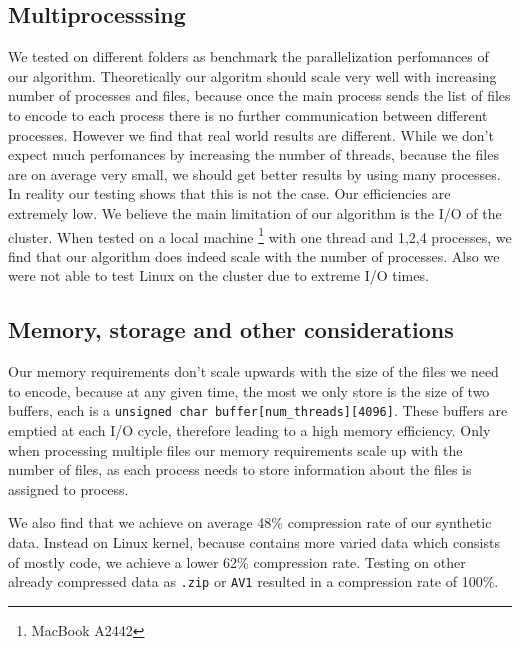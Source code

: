 \subsection{Multiprocesssing}
We tested on different folders as benchmark the parallelization perfomances of our algorithm. Theoretically our algoritm should scale very well with increasing number of processes and files, because once the main process sends the list of files to encode to each process there is no further communication between different processes. However we find that real world results are different. 
While we don't expect much perfomances by increasing the number of threads, because the files are on average very small, we should get better results by using many processes.
In reality our testing shows that this is not the case. Our efficiencies are extremely low. We believe the main limitation of our algorithm is the I/O of the cluster. When tested on a local machine \footnote{MacBook A2442} with one thread and 1,2,4 processes, we find that our algorithm does indeed scale with the number of processes. Also we were not able to test Linux on the cluster due to extreme I/O times.
\subsection{Memory, storage and other considerations}
Our memory requirements don't scale upwards with the size of the files we need to encode, because at any given time, the most we only store is the size of two buffers, each is a \verb|unsigned char buffer[num_threads][4096]|. These buffers are emptied at each I/O cycle, therefore leading to a high memory efficiency. Only when processing multiple files our memory requirements scale up with the number of files, as each process needs to store information about the files is assigned to process.

We also find that we achieve on average 48\% compression rate of our synthetic data. Instead on Linux kernel, because contains more varied data which consists of mostly code, we achieve a lower 62\% compression rate. Testing on other already compressed data as \verb|.zip| or \verb|AV1| resulted in a compression rate of 100\%.